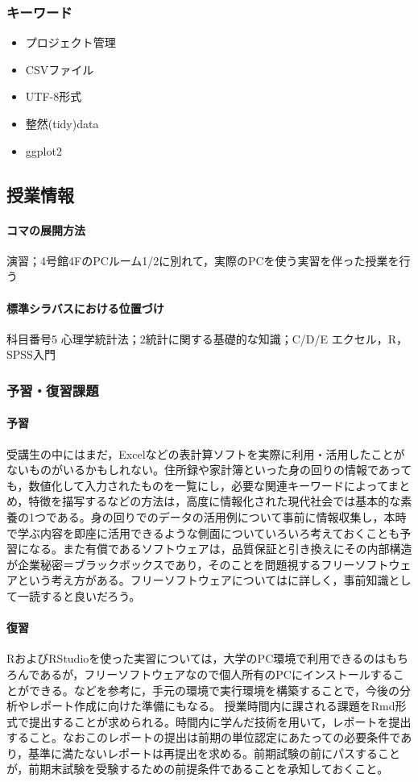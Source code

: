 \subsubsection{キーワード}
\begin{itemize}
	\item プロジェクト管理
	\item CSVファイル
	\item UTF-8形式
	\item 整然(tidy)data
	\item ggplot2
\end{itemize}
\subsection{授業情報}
\paragraph{コマの展開方法}
演習；4号館4FのPCルーム1/2に別れて，実際のPCを使う実習を伴った授業を行う
\paragraph{標準シラバスにおける位置づけ}
科目番号5 心理学統計法；2統計に関する基礎的な知識；C/D/E エクセル，R，SPSS入門
\subsubsection{予習・復習課題}
\paragraph{予習}
受講生の中にはまだ，Excelなどの表計算ソフトを実際に利用・活用したことがないものがいるかもしれない。住所録や家計簿といった身の回りの情報であっても，数値化して入力されたものを一覧にし，必要な関連キーワードによってまとめ，特徴を描写するなどの方法は，高度に情報化された現代社会では基本的な素養の1つである。身の回りでのデータの活用例について事前に情報収集し，本時で学ぶ内容を即座に活用できるような側面についていろいろ考えておくことも予習になる。また有償であるソフトウェアは，品質保証と引き換えにその内部構造が企業秘密＝ブラックボックスであり，そのことを問題視するフリーソフトウェアという考え方がある。フリーソフトウェアについては\cite{Nagao200305}に詳しく，事前知識として一読すると良いだろう。
\paragraph{復習}
RおよびRStudioを使った実習については，大学のPC環境で利用できるのはもちろんであるが，フリーソフトウェアなので個人所有のPCにインストールすることができる。\citet{kosugi2019}などを参考に，手元の環境で実行環境を構築することで，今後の分析やレポート作成に向けた準備にもなる。
授業時間内に課される課題をRmd形式で提出することが求められる。時間内に学んだ技術を用いて，レポートを提出すること。なおこのレポートの提出は前期の単位認定にあたっての必要条件であり，基準に満たないレポートは再提出を求める。前期試験の前にパスすることが，前期末試験を受験するための前提条件であることを承知しておくこと。

